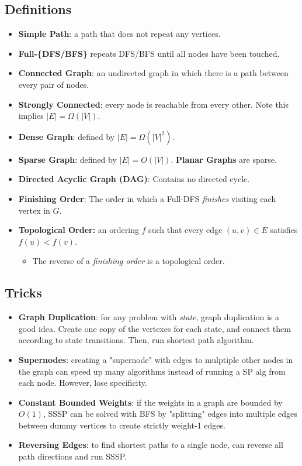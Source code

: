 \documentclass{article}
\begin{document}
\subsection{Definitions}
\begin{itemize}[noitemsep]
    \item \textbf{Simple Path}: a path that does not repeat any vertices.
    \item \textbf{Full-\{DFS/BFS\}} repeats DFS/BFS until all nodes have been touched.
    \item \textbf{Connected Graph}: an undirected graph in which there is a path between every pair of nodes.
    \item \textbf{Strongly Connected}: every node is reachable from every other. Note this implies $|E|=\Omega(|V|)$.
    \item \textbf{Dense Graph}: defined by $|E| = \Omega(|V|^2)$.
    \item \textbf{Sparse Graph}: defined by $|E| = O(|V|)$. \textbf{Planar Graphs} are sparse.
    \item \textbf{Directed Acyclic Graph (DAG)}: Contains no directed cycle.
    \item \textbf{Finishing Order}: The order in which a Full-DFS \emph{finishes} visiting each vertex in $G$.
    \item \textbf{Topological Order:} an ordering $f$ such that every edge $(u,v) \in E$ satisfies $f(u)<f(v)$.
    \begin{itemize}[topsep=0pt,noitemsep]
        \item The reverse of a \textit{finishing order} is a topological order.
    \end{itemize}
\end{itemize}

\subsection{Tricks}
\begin{itemize}[noitemsep]
    \item \textbf{Graph Duplication}: for any problem with \emph{state}, graph duplication is a good idea. Create one copy of the vertexes for each state, and connect them according to state transitions. Then, run shortest path algorithm.
    \item \textbf{Supernodes}: creating a "supernode" with edges to mulptiple other nodes in the graph can speed up many algorithms instead of running a SP alg from each node. However, lose specificity.
    \item \textbf{Constant Bounded Weights}: if the weights in a graph are bounded by $O(1)$, SSSP can be solved with BFS by "splitting" edges into multiple edges between dummy vertices to create strictly weight-1 edges.
    \item \textbf{Reversing Edges}: to find shortest paths \emph{to} a single node, can reverse all path directions and run SSSP.
\end{itemize}
\end{document}
